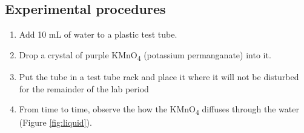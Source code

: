 \subsection{Experimental procedures}\label{experimental-procedures-14}

\begin{enumerate}
\def\labelenumi{\arabic{enumi}.}
\tightlist
\item
  Add 10 mL of water to a plastic test tube.
\item
  Drop a crystal of purple KMnO\textsubscript{4} (potassium
  permanganate) into it.
\item
  Put the tube in a test tube rack and place it where it will not be
  disturbed for the remainder of the lab period
\item
  From time to time, observe the how the KMnO\textsubscript{4} diffuses
  through the water (Figure \ref{fig:liquid}).
\end{enumerate}

